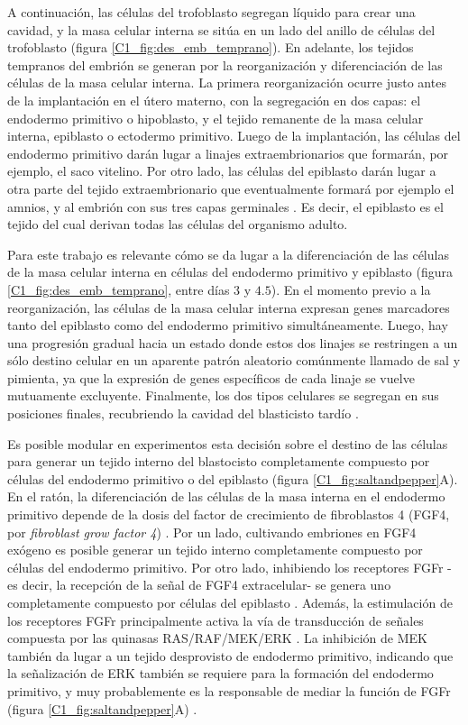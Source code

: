 \documentclass[./main.tex]{subfiles}
\begin{document}
A continuación, las células del trofoblasto segregan líquido para crear una cavidad, y la masa celular interna se sitúa en un lado del anillo de células del trofoblasto  (figura \ref{C1_fig:des_emb_temprano}). En adelante, los tejidos tempranos del embrión se generan por la reorganización y diferenciación de las células de la masa celular interna. La primera reorganización ocurre justo antes de la implantación en el útero materno, con la segregación en dos capas: el endodermo primitivo o hipoblasto, y el tejido remanente de la masa celular interna, epiblasto o ectodermo primitivo. Luego de la implantación, las células del endodermo primitivo darán lugar a linajes extraembrionarios que formarán, por ejemplo, el saco vitelino. Por otro lado, las células del epiblasto darán lugar a otra parte del tejido extraembrionario que eventualmente formará por ejemplo el amnios, y al embrión con sus tres capas germinales \cite{Beddington1999,Nakamura2016,Gardner1983}. Es decir, el epiblasto es el tejido del cual derivan todas las células del organismo adulto.


Para este trabajo es relevante cómo se da lugar a la diferenciación de las células de la masa celular interna en células del endodermo primitivo y epiblasto (figura \ref{C1_fig:des_emb_temprano}, entre días $3$ y $4.5$). En el momento previo a la reorganización, las células de la masa celular interna expresan genes marcadores tanto del epiblasto como del endodermo primitivo simultáneamente. Luego, hay una progresión gradual hacia un estado donde estos dos linajes se restringen a un sólo destino celular en un aparente patrón aleatorio comúnmente llamado de sal y pimienta, ya que la expresión de genes específicos de cada linaje se vuelve mutuamente excluyente. Finalmente, los dos tipos celulares se segregan en sus posiciones finales, recubriendo la cavidad del blasticisto tardío \cite{Plusa2008}. 


Es posible modular en experimentos esta decisión sobre el destino de las células para generar un tejido interno del blastocisto completamente compuesto por células del endodermo primitivo o del epiblasto (figura \ref{C1_fig:saltandpepper}A). En el ratón, la diferenciación de las células de la masa interna en el endodermo primitivo depende de la dosis del factor de crecimiento de fibroblastos 4 (FGF4, por \textit{fibroblast grow factor 4}) \cite{Kang2013,Krawchuk2013,Ohnishi2014}. Por un lado, cultivando embriones en FGF4 exógeno es posible generar un tejido interno completamente compuesto por células del endodermo primitivo. Por otro lado, inhibiendo los receptores FGFr -es decir, la recepción de la señal de FGF4 extracelular- se genera uno completamente compuesto por células del epiblasto \cite{Yamanaka2010,Grabarek2012}. Además, la estimulación de los receptores FGFr principalmente activa la vía de transducción de señales compuesta por las quinasas RAS/RAF/MEK/ERK \cite{Brewer2016}. La inhibición de MEK también da lugar a un tejido desprovisto de endodermo primitivo, indicando que la señalización de ERK también se requiere para la formación del endodermo primitivo, y muy probablemente es la responsable de mediar la función de FGFr (figura \ref{C1_fig:saltandpepper}A) \cite{Nichols2009}.  
\end{document}
